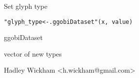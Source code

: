\begin{Description}\relax
Set glyph type
\end{Description}
\begin{Usage}
\begin{verbatim}"glyph_type<-.ggobiDataset"(x, value)\end{verbatim}
\end{Usage}
\begin{Arguments}
\begin{ldescription}
\item[\code{x}] ggobiDataset
\item[\code{value}] vector of new types
\end{ldescription}
\end{Arguments}
\begin{Details}\relax
\end{Details}
\begin{Author}\relax
Hadley Wickham <h.wickham@gmail.com>
\end{Author}
\begin{SeeAlso}\relax
{}
\end{SeeAlso}
\begin{Examples}
\begin{ExampleCode}\end{ExampleCode}
\end{Examples}

